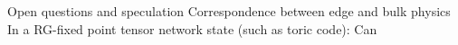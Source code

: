 \begin{frame}{Open questions and speculation}
Correspondence between edge and bulk physics
In a RG-fixed point tensor network state (such as toric code):
Can 
\end{frame}